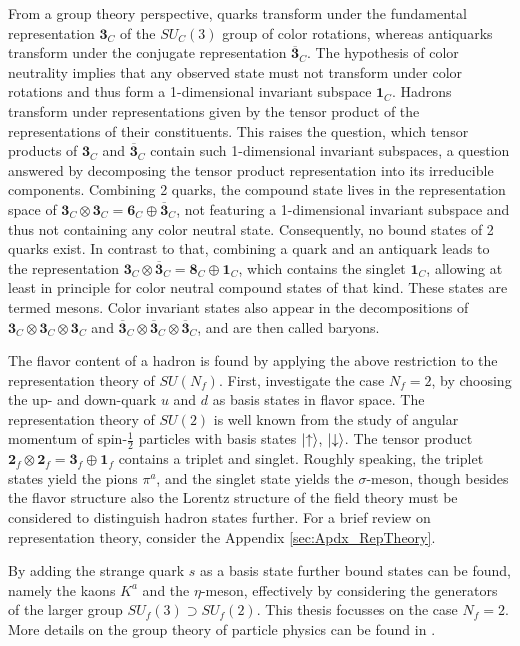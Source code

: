 From a group theory perspective, quarks transform under the fundamental representation $\mathbf{3}_C$ of the $SU_C(3)$ group of color rotations, whereas antiquarks transform under the conjugate representation $\overline{\mathbf{3}}_C$. The hypothesis of color neutrality implies that any observed state must not transform under color rotations and thus form a 1-dimensional invariant subspace $\mathbf{1}_C$. Hadrons transform under representations given by the tensor product of the representations of their constituents. This raises the question, which tensor products of $\mathbf{3}_C$ and $\overline{\mathbf{3}}_C$ contain such 1-dimensional invariant subspaces, a question answered by decomposing the tensor product representation into its irreducible components. Combining 2 quarks, the compound state lives in the representation space of ${\mathbf{3}_C\otimes\mathbf{3}_C=\mathbf{6}_C\oplus\overline{\mathbf{3}}_C}$, not featuring a 1-dimensional invariant subspace and thus not containing any color neutral state. Consequently, no bound states of 2 quarks exist. In contrast to that, combining a quark and an antiquark leads to the representation ${\mathbf{3}_C\otimes\overline{\mathbf{3}}_C=\mathbf{8}_C\oplus\mathbf{1}_C}$, which contains the singlet $\mathbf{1}_C$, allowing at least in principle for color neutral compound states of that kind. These states are termed mesons. Color invariant states also appear in the decompositions of ${\mathbf{3}_C\otimes \mathbf{3}_C\otimes \mathbf{3}_C}$ and ${\overline{\mathbf{3}}_C\otimes \overline{\mathbf{3}}_C\otimes \overline{\mathbf{3}}_C}$, and are then called baryons.

The flavor content of a hadron is found by applying the above restriction to the representation theory of $SU(N_f)$. First, investigate the case ${N_f=2}$, by choosing the up- and down-quark $u$ and $d$ as basis states in flavor space. The representation theory of $SU(2)$ is well known from the study of angular momentum of spin-$\frac{1}{2}$ particles with basis states ${\lvert\uparrow\rangle}$, ${\lvert\downarrow\rangle}$. The tensor product ${\mathbf{2}_f\otimes\mathbf{2}_f=\mathbf{3}_f\oplus\mathbf{1}_f}$ contains a triplet and singlet. Roughly speaking, the triplet states yield the pions $\pi^a$, and the singlet state yields the $\sigma$-meson, though besides the flavor structure also the Lorentz structure of the field theory must be considered to distinguish hadron states further. For a brief review on representation theory, consider the Appendix \ref{sec:Apdx_RepTheory}.

By adding the strange quark $s$ as a basis state further bound states can be found, namely the kaons $K^a$ and the $\eta$-meson, effectively by considering the generators of the larger group ${SU_f(3)\supset SU_f(2)}$. This thesis focusses on the case ${N_f=2}$. More details on the group theory of particle physics can be found in \cite{Floerchinger_2020}.

